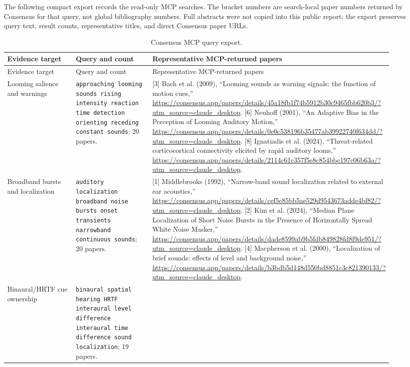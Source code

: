 The following compact export records the read-only MCP searches. The bracket numbers are search-local paper numbers returned by Consensus for that query, not global bibliography numbers. Full abstracts were not copied into this public report; the export preserves query text, result counts, representative titles, and direct Consensus paper URLs.

\begin{longtable}{P{0.20\linewidth} P{0.24\linewidth} P{0.48\linewidth}}
\caption{Consensus MCP query export.}\\
\toprule
Evidence target & Query and count & Representative MCP-returned papers\\
\midrule
\endfirsthead
\toprule
Evidence target & Query and count & Representative MCP-returned papers\\
\midrule
\endhead
Looming salience and warnings
& \texttt{approaching looming sounds rising intensity reaction time detection orienting receding constant sounds}; 20 papers.
& [3] Bach et al. (2009), ``Looming sounds as warning signals: the function of motion cues,'' \url{https://consensus.app/papers/details/45a18fb1f74b5912b30c9465fbb620b3/?utm_source=claude_desktop}. [6] Neuhoff (2001), ``An Adaptive Bias in the Perception of Looming Auditory Motion,'' \url{https://consensus.app/papers/details/0e0c538196b35477ab39922740f634dd/?utm_source=claude_desktop}. [8] Ignatiadis et al. (2024), ``Threat-related corticocortical connectivity elicited by rapid auditory looms,'' \url{https://consensus.app/papers/details/2114c61c357f5e8c854bbc197c06b63a/?utm_source=claude_desktop}.\\
\addlinespace
Broadband bursts and localization
& \texttt{auditory localization broadband noise bursts onset transients narrowband continuous sounds}; 20 papers.
& [1] Middlebrooks (1992), ``Narrow-band sound localization related to external ear acoustics,'' \url{https://consensus.app/papers/details/cef5e85bb5ae529d9543673adde4bf82/?utm_source=claude_desktop}. [2] Kim et al. (2024), ``Median Plane Localization of Short Noise Bursts in the Presence of Horizontally Spread White Noise Masker,'' \url{https://consensus.app/papers/details/dade8599ab9b5fdb849828fd8f9de951/?utm_source=claude_desktop}. [4] Macpherson et al. (2000), ``Localization of brief sounds: effects of level and background noise,'' \url{https://consensus.app/papers/details/b3bdb5d148d550bd8851c3c821390133/?utm_source=claude_desktop}.\\
\addlinespace
Binaural/HRTF cue ownership
& \texttt{binaural spatial hearing HRTF interaural level difference interaural time difference sound localization}; 19 papers.

\end{longtable}
